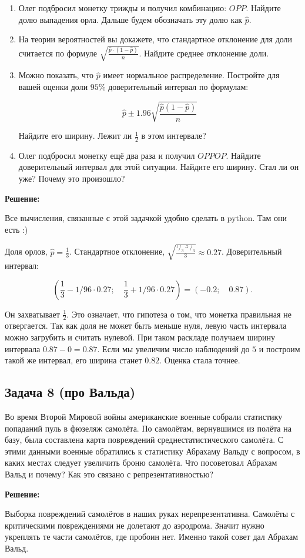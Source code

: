 \documentclass[12pt, a4paper, oneside]{article}
\begin{document}
\begin{enumerate}
	\item  Олег подбросил монетку трижды и получил комбинацию: $OPP$. Найдите долю выпадения орла.  Дальше будем обозначать эту долю как $\hat p$. 
	
	\item  На теории вероятностей вы докажете, что стандартное отклонение для доли считается по формуле $ \sqrt{\frac{\hat p \cdot (1 - \hat p)}{n}}.$ Найдите среднее отклонение доли. 
	
	\item Можно показать, что $\hat p$ имеет нормальное распределение. Постройте для вашей оценки доли $95\%$ доверительный интервал по формулам: 
	
	$$\hat{p}\pm 1.96 \sqrt{\frac{\hat{p}\left(1-\hat{p}\right)}{n}}$$
	
	Найдите его ширину.  Лежит ли $\frac{1}{2}$ в этом интервале? 
	
	\item Олег подбросил монетку ещё два раза и получил $OPPOP$. Найдите доверительный интервал для этой ситуации. Найдите его ширину. Стал ли он уже? Почему это произошло? 
\end{enumerate}

\textbf{Решение:} 

Все вычисления, связанные с этой задачкой удобно сделать в python. Там они есть :) 

Доля орлов,  $\hat p = \frac{1}{3}$. Стандартное отклонение, $\sqrt{\frac{^1/_3 \cdot ^2/_3}{3}} \approx 0.27$. Доверительный интервал: 

\[
\left( \frac{1}{3} - 1/96 \cdot 0.27;  \quad \frac{1}{3} + 1/96 \cdot 0.27 \right) = (-0.2; \quad 0.87).
\]

Он захватывает $\frac{1}{2}$. Это означает, что гипотеза о том, что монетка правильная не отвергается. Так как доля не может быть меньше нуля, левую часть интервала можно загрубить и считать нулевой. При таком раскладе получаем ширину интервала $0.87 - 0 = 0.87$. Если мы увеличим число наблюдений до $5$ и построим такой же интервал, его ширина станет $0.82$. Оценка стала точнее. 


\subsection*{Задача  8 (про Вальда)} 

Во время Второй Мировой войны американские военные собрали статистику попаданий пуль в фюзеляж самолёта. По самолётам, вернувшимся из полёта на базу, была составлена карта повреждений среднестатистического самолёта. С этими данными военные обратились к статистику Абрахаму Вальду с вопросом, в каких местах следует увеличить броню самолёта. Что посоветовал Абрахам Вальд и почему? Как это связано с репрезентативностью? 

\textbf{Решение:} 

Выборка повреждений самолётов в наших руках нерепрезентативна. Самолёты с критическими повреждениями не долетают до аэродрома. Значит нужно укреплять те части самолётов, где пробоин нет. Именно такой совет дал Абрахам Вальд. 
\end{document}
